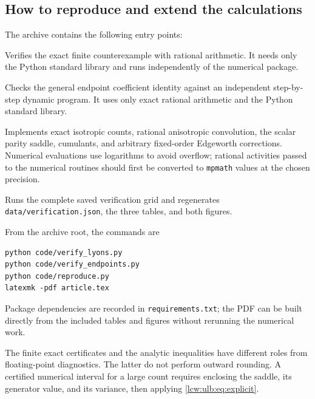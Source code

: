 \documentclass[11pt,letterpaper]{article}
\theoremstyle{remark}\newtheorem{remark}[theorem]{Remark}
\begin{document}
\subsection{How to reproduce and extend the calculations}

The archive contains the following entry points:
\begin{description}[style=nextline]
\item[\texttt{code/verify\_lyons.py}]
Verifies the exact finite counterexample with rational arithmetic.
It needs only the Python standard library and runs independently of
the numerical package.
\item[\texttt{code/verify\_endpoints.py}]
Checks the general endpoint coefficient identity against an independent
step-by-step dynamic program. It uses only exact rational arithmetic
and the Python standard library.
\item[\texttt{code/walks.py}]
Implements exact isotropic counts, rational anisotropic convolution,
the scalar parity saddle, cumulants, and arbitrary fixed-order
Edgeworth corrections. Numerical evaluations use logarithms to avoid
overflow; rational activities passed to the numerical routines should
first be converted to \texttt{mpmath} values at the chosen precision.
\item[\texttt{code/reproduce.py}]
Runs the complete saved verification grid and regenerates
\texttt{data/verification.json}, the three tables, and both figures.
\end{description}
From the archive root, the commands are
\begin{verbatim}
python code/verify_lyons.py
python code/verify_endpoints.py
python code/reproduce.py
latexmk -pdf article.tex
\end{verbatim}
Package dependencies are recorded
in \texttt{requirements.txt}; the PDF can be built directly from the
included tables and figures without rerunning the numerical work.

The finite exact certificates and the analytic inequalities have
different roles from floating-point diagnostics. The latter do not
perform outward rounding. A certified numerical interval for a large
count requires enclosing the saddle, its generator value, and its
variance, then applying \eqref{lcw:ulb:eq:explicit}.
\end{document}
